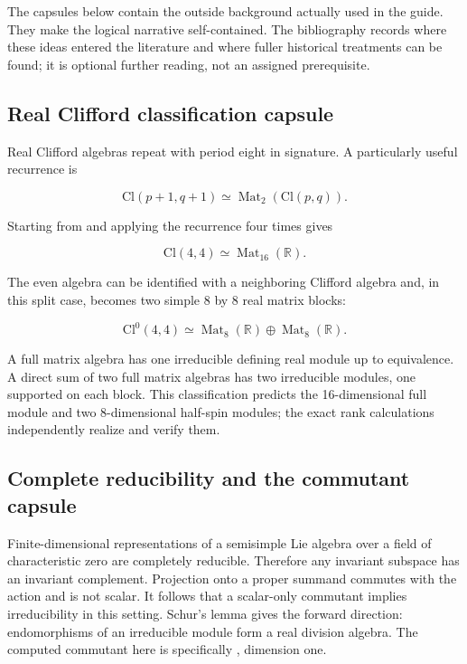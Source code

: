\documentclass[11pt]{article}
\begin{document}
The capsules below contain the outside background actually used in the guide. They make the logical narrative self-contained. The bibliography records where these ideas entered the literature and where fuller historical treatments can be found; it is optional further reading, not an assigned prerequisite.

\subsection{Real Clifford classification capsule}

Real Clifford algebras repeat with period eight in signature. A particularly useful recurrence is

\[
\mathrm{Cl}(p+1,q+1)
\simeq\operatorname{Mat}_2(\mathrm{Cl}(p,q)).
\]

Starting from \texttt{} and applying the recurrence four times gives

\[
\mathrm{Cl}(4,4)
\simeq\operatorname{Mat}_{16}(\mathbb R).
\]

The even algebra can be identified with a neighboring Clifford algebra and, in this split case, becomes two simple 8 by 8 real matrix blocks:

\[
\mathrm{Cl}^0(4,4)
\simeq\operatorname{Mat}_{8}(\mathbb R)
\mathbin{\oplus}\operatorname{Mat}_{8}(\mathbb R).
\]

A full matrix algebra has one irreducible defining real module up to equivalence. A direct sum of two full matrix algebras has two irreducible modules, one supported on each block. This classification predicts the 16-dimensional full module and two 8-dimensional half-spin modules; the exact rank calculations independently realize and verify them.

\subsection{Complete reducibility and the commutant capsule}

Finite-dimensional representations of a semisimple Lie algebra over a field of characteristic zero are completely reducible. Therefore any invariant subspace has an invariant complement. Projection onto a proper summand commutes with the action and is not scalar. It follows that a scalar-only commutant implies irreducibility in this setting. Schur's lemma gives the forward direction: endomorphisms of an irreducible module form a real division algebra. The computed commutant here is specifically \texttt{}, dimension one.
\end{document}

